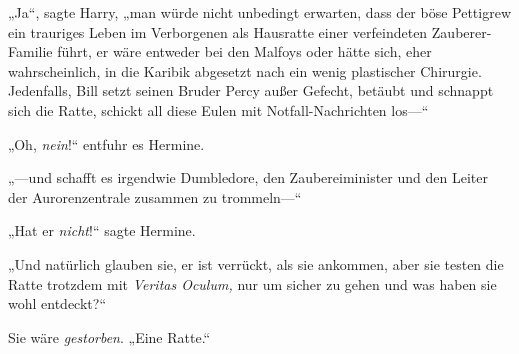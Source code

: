 „Ja“, sagte Harry, „man würde nicht unbedingt erwarten, dass der böse Pettigrew ein trauriges Leben im Verborgenen als Hausratte einer verfeindeten Zauberer-Familie führt, er wäre entweder bei den Malfoys oder hätte sich, eher wahrscheinlich, in die Karibik abgesetzt nach ein wenig plastischer Chirurgie. Jedenfalls, Bill setzt seinen Bruder Percy außer Gefecht, betäubt und schnappt sich die Ratte, schickt all diese Eulen mit Notfall-Nachrichten los—“

„Oh, \emph{nein}!“ entfuhr es Hermine.

„—und schafft es irgendwie Dumbledore, den Zaubereiminister und den Leiter der Aurorenzentrale zusammen zu trommeln—“

„Hat er \emph{nicht}!“ sagte Hermine.

„Und natürlich glauben sie, er ist verrückt, als sie ankommen, aber sie testen die Ratte trotzdem mit \emph{Veritas Oculum,} nur um sicher zu gehen und was haben sie wohl entdeckt?“%

Sie wäre \emph{gestorben}. „Eine Ratte.“

